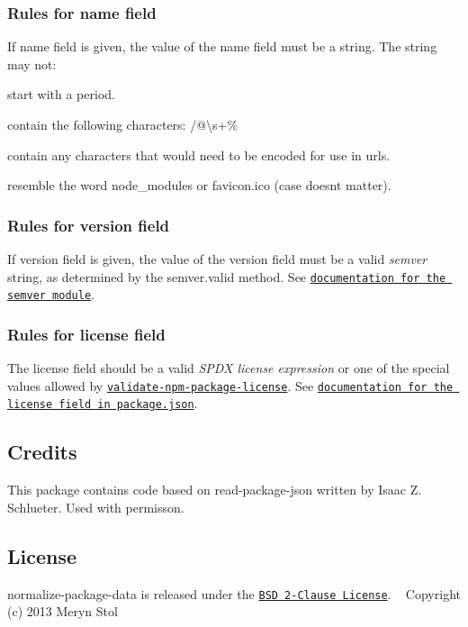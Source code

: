 \subsubsection*{Rules for name field}

If {\ttfamily name} field is given, the value of the name field must be a string. The string may not\+:


\begin{DoxyItemize}
\item start with a period.
\item contain the following characters\+: {\ttfamily /@\textbackslash{}s+\%}
\item contain any characters that would need to be encoded for use in urls.
\item resemble the word {\ttfamily node\+\_\+modules} or {\ttfamily favicon.\+ico} (case doesn\textquotesingle{}t matter).
\end{DoxyItemize}

\subsubsection*{Rules for version field}

If {\ttfamily version} field is given, the value of the version field must be a valid {\itshape semver} string, as determined by the {\ttfamily semver.\+valid} method. See \href{https://github.com/isaacs/node-semver}{\tt documentation for the semver module}.

\subsubsection*{Rules for license field}

The {\ttfamily license} field should be a valid {\itshape S\+P\+DX license expression} or one of the special values allowed by \href{https://npmjs.com/package/validate-npm-package-license}{\tt validate-\/npm-\/package-\/license}. See \href{https://docs.npmjs.com/files/package.json#license}{\tt documentation for the license field in package.\+json}.

\subsection*{Credits}

This package contains code based on read-\/package-\/json written by Isaac Z. Schlueter. Used with permisson.

\subsection*{License}

normalize-\/package-\/data is released under the \href{http://opensource.org/licenses/MIT}{\tt B\+SD 2-\/\+Clause License}. ~\newline
Copyright (c) 2013 Meryn Stol 